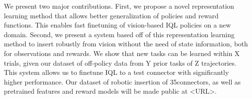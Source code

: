 \documentclass{article}
\newcommand{\numconnectors}{35}
\begin{document}
We present two major contributions.
First, we propose a novel representation learning method that allows better generalization of policies and reward functions.
This enables fast finetuning of vision-based IQL
policies on a new domain. 
Second, we present a system based off of this representation learning method to insert robustly from vision without the need of state information,
both for observations and rewards.
We show that new tasks can be learned within X trials, given our dataset of off-policy data from Y prior tasks of Z trajectories.
This system allows us to finetune IQL to a test connector with significantly higher performance.
Our dataset of robotic insertion of \numconnectors connectors, as well as pretrained features and reward models will be made public at <URL>.

\end{document}
